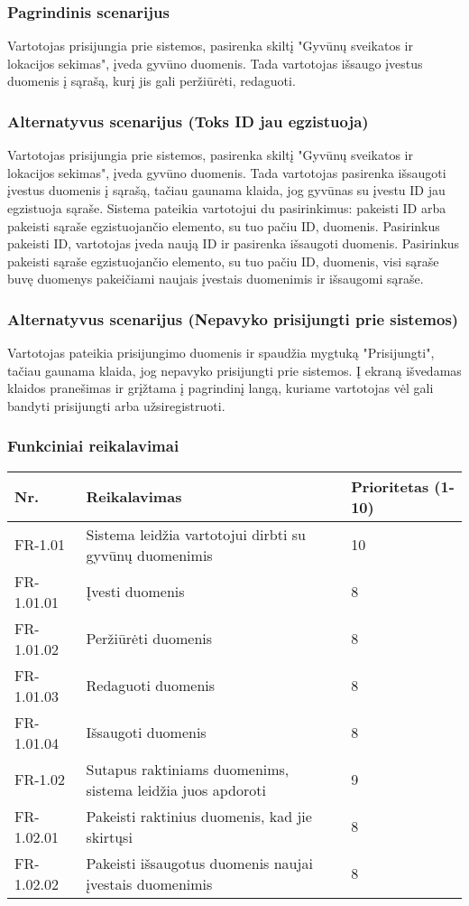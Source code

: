 \documentclass[oneside]{VUMIFPSkursinis}
\begin{document}
\subsubsection{Pagrindinis scenarijus}
	Vartotojas prisijungia prie sistemos, pasirenka skiltį "Gyvūnų sveikatos ir lokacijos sekimas", įveda gyvūno duomenis. Tada vartotojas išsaugo įvestus duomenis į sąrašą, kurį jis gali peržiūrėti, redaguoti.
\subsubsection{Alternatyvus scenarijus (Toks ID jau egzistuoja)}
	Vartotojas prisijungia prie sistemos, pasirenka skiltį "Gyvūnų sveikatos ir lokacijos sekimas", įveda gyvūno duomenis. Tada vartotojas pasirenka išsaugoti įvestus duomenis į sąrašą, tačiau gaunama klaida, jog gyvūnas su įvestu ID jau egzistuoja sąraše. Sistema pateikia vartotojui du pasirinkimus: pakeisti ID arba pakeisti sąraše egzistuojančio elemento, su tuo pačiu ID, duomenis.
	Pasirinkus pakeisti ID, vartotojas įveda naują ID ir pasirenka išsaugoti duomenis. 
	Pasirinkus pakeisti sąraše egzistuojančio elemento, su tuo pačiu ID, duomenis, visi sąraše buvę duomenys pakeičiami naujais įvestais duomenimis ir išsaugomi sąraše.
\subsubsection{Alternatyvus scenarijus (Nepavyko prisijungti prie sistemos)}
	Vartotojas pateikia prisijungimo duomenis ir spaudžia mygtuką "Prisijungti", tačiau gaunama klaida, jog nepavyko prisijungti prie sistemos. Į ekraną išvedamas klaidos pranešimas ir grįžtama į pagrindinį langą, kuriame vartotojas vėl gali bandyti prisijungti arba užsiregistruoti.
\subsubsection{Funkciniai reikalavimai}
\begin{table}[htbp]
	\begin{tabularx}{1\textwidth}{ |P{2.5cm}|X|P{3cm }| } \hline
    Nr. & Reikalavimas &  Prioritetas (1-10)  \\   \hline 
    FR-1.01 & Sistema leidžia vartotojui dirbti su gyvūnų duomenimis & 10  \\   \hline
		FR-1.01.01 & Įvesti duomenis & 8 \\ \hline
		FR-1.01.02 & Peržiūrėti duomenis & 8 \\ \hline
		FR-1.01.03 & Redaguoti duomenis & 8 \\ \hline
		FR-1.01.04 & Išsaugoti duomenis & 8 \\ \hline
    FR-1.02 & Sutapus raktiniams duomenims, sistema leidžia juos apdoroti & 9   \\   \hline
		FR-1.02.01 & Pakeisti raktinius duomenis, kad jie skirtųsi & 8 \\ \hline
		FR-1.02.02 & Pakeisti išsaugotus duomenis naujai įvestais duomenimis & 8 \\ \hline
	\end{tabularx}
\end{table}
\end{document}
